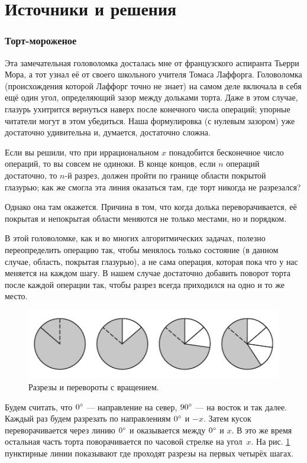 \section*{Источники и решения}

\subsubsection*{Торт-мороженое}

Эта замечательная головоломка досталась мне от французского аспиранта Тьерри Мора,
а тот узнал её от своего школьного учителя Томаса Лаффорга.
Головоломка (происхождения которой Лаффорг точно не знает) на самом деле включала в себя ещё один угол, определяющий зазор между дольками торта.
Даже в этом случае, глазурь ухитрится вернуться наверх после конечного числа операций;
упорные читатели могут в этом убедиться.
Наша формулировка (с нулевым зазором) уже достаточно удивительна и, думается, достаточно сложна.

Если вы решили, что при иррациональном $x$ понадобится бесконечное число операций, то вы совсем не одиноки.
В конце концов, если $n$ операций достаточно, то $n$-й разрез, должен пройти по границе области покрытой глазурью;
как же смогла эта линия оказаться там, где торт никогда не разрезался?

Однако она там окажется.
Причина в том, что когда долька переворачивается, её покрытая и непокрытая области  меняются не только местами, но и порядком.

В этой головоломке, как и во многих алгоритмических задачах, полезно переопределить операцию так, чтобы менялось только состояние (в данном случае, область, покрытая глазурью), а не сама операция, которая пока что у нас меняется на каждом шагу.
В нашем случае достаточно добавить поворот торта после каждой операции так, чтобы разрез всегда приходился на одно и то же место.


\begin{figure}[htb!]
\centering
\includegraphics[scale=.9]{pics/tort2}
\caption{Разрезы и перевороты с вращением.}
\label{pic:tort2}
\end{figure}

Будем считать, что $0\degree$ --- направление на север,
$90\degree$ --- на восток и так далее.
Каждый раз будем разрезать по направлениям $0\degree$ и $-x$.
Затем кусок переворачивается через линию $0\degree$ и оказывается между $0\degree$ и $x$.
В это же время остальная часть торта поворачивается по часовой стрелке на угол~$x$.
На рис. \ref{pic:tort2} пунктирные линии показывают где проходят разрезы на первых четырёх шагах.

